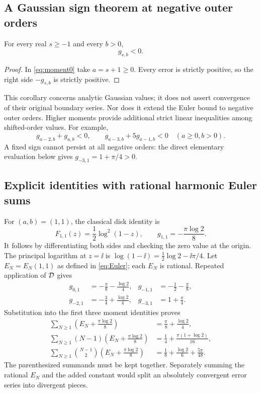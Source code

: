 \subsection{A Gaussian sign theorem at negative outer orders}
\begin{corollary}\label{cor:negativeorder}
For every real $s\ge-1$ and every $b>0$,
\begin{equation}\label{eq:negativeorder}
 g_{s,b}<0.
\end{equation}
\end{corollary}
\begin{proof}
In \eqref{eq:moment0} take $a=s+1\ge0$. Every error is strictly positive, so the right side $-g_{s,b}$ is strictly positive.
\end{proof}
This corollary concerns analytic Gaussian values; it does not assert convergence of their original boundary series. Nor does it extend the Euler bound to negative outer orders. Higher moments provide additional strict linear inequalities among shifted-order values. For example,
\[
 g_{a-2,b}+g_{a,b}<0,\qquad
 g_{a-3,b}+5g_{a-1,b}<0\quad(a\ge0,b>0).
\]
A fixed sign cannot persist at all negative orders: the direct elementary evaluation below gives $g_{-3,1}=1+\pi/4>0$.

\subsection{Explicit identities with rational harmonic Euler sums}
For $(a,b)=(1,1)$, the classical disk identity is
\[
 F_{1,1}(z)=\frac12\log^2(1-z),\qquad
 g_{1,1}=-\frac{\pi\log2}{8}.
\]
It follows by differentiating both sides and checking the zero value at the origin. The principal logarithm at $z=\ii$ is
$\log(1-\ii)=\tfrac12\log2-\ii\pi/4$. Let $E_N=E_N(1,1)$ as defined in \eqref{eq:Euler}; each $E_N$ is rational. Repeated application of $\mathcal D$ gives
\begin{align*}
 g_{0,1}&=-\frac\pi8-\frac{\log2}{4},&
 g_{-1,1}&=-\frac12-\frac\pi8,\\
 g_{-2,1}&=-\frac34+\frac{\log2}{4},&
 g_{-3,1}&=1+\frac\pi4.
\end{align*}
Substitution into the first three moment identities proves
\begin{align}
 \sum_{N\ge1}\left(E_N+\frac{\pi\log2}{8}\right)
 &=\frac\pi8+\frac{\log2}{4},\label{eq:explicit0}\\
 \sum_{N\ge1}(N-1)\left(E_N+\frac{\pi\log2}{8}\right)
 &=\frac14+\frac{\pi(1+\log2)}{16},\label{eq:explicit1}\\
 \sum_{N\ge1}\binom{N-1}{2}\left(E_N+\frac{\pi\log2}{8}\right)
 &=\frac18+\frac{\log2}{6}+\frac{5\pi}{48}.\label{eq:explicit2}
\end{align}
The parenthesized summands must be kept together. Separately summing the rational $E_N$ and the added constant would split an absolutely convergent error series into divergent pieces.

